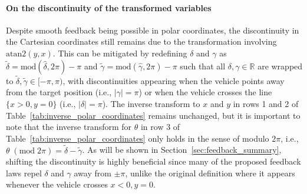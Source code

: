 \documentclass[journal,twoside,web]{ieeecolor}
\theoremstyle{definition}
\begin{document}
\paragraph{On the discontinuity of the transformed variables}



Despite smooth feedback being possible in polar coordinates, the discontinuity in the Cartesian coordinates still remains due to the transformation involving $\text{atan2}(y,x)$.
This can be mitigated by redefining $\delta$ and $\gamma$ as $\tilde{\delta} = \mbox{mod}(\hat{\delta} %
, 2\pi) - \pi$  and  $\tilde{\gamma} = \mbox{mod}(\hat{\gamma}, 2\pi) - \pi$
such that all $\delta, \gamma \in \mathbb{R}$ are wrapped to $ \tilde{\delta}, \tilde{\gamma}\in [-\pi, \pi)$, with discontinuities appearing 
when the vehicle points away from the target position (i.e., $|\gamma| = \pi$) or when the vehicle crosses the line $\{x>0,y=0\}$ (i.e., $|\delta| = \pi$). The inverse transform to $x$ and $y$ in rows 1 and 2 of Table~\ref{tab:inverse_polar_coordinates} remains unchanged, but it is important to note that the inverse transform for $\theta$ in row 3 of Table~\ref{tab:inverse_polar_coordinates} only holds in the sense of modulo $2\pi$, i.e., $\theta \;(\mbox{mod} \; 2\pi) = \tilde{\delta} - \tilde{\gamma}$. As will be shown in Section~\ref{sec:feedback_summary}, shifting the discontinuity is highly beneficial since many of the proposed feedback laws repel $\delta$ and $\gamma$ away from $\pm\pi$, unlike the original definition where it appears whenever the vehicle crosses ${x<0, y=0}$.
\end{document}
